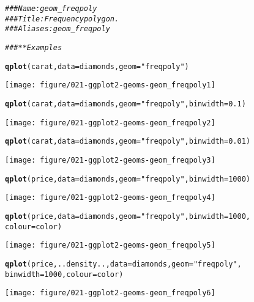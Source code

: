\documentclass[a4paper,titlepage]{tufte-handout}\usepackage[]{graphicx}\usepackage[]{color}
\makeatletter
\def\maxwidth{ %
  \ifdim\Gin@nat@width>\linewidth
    \linewidth
  \else
    \Gin@nat@width
  \fi
}
\newcommand{\hlnum}[1]{\textcolor[rgb]{0.686,0.059,0.569}{#1}}%
\newcommand{\hlstr}[1]{\textcolor[rgb]{0.192,0.494,0.8}{#1}}%
\newcommand{\hlcom}[1]{\textcolor[rgb]{0.678,0.584,0.686}{\textit{#1}}}%
\newcommand{\hlstd}[1]{\textcolor[rgb]{0.345,0.345,0.345}{#1}}%
\newcommand{\hlkwc}[1]{\textcolor[rgb]{0.333,0.667,0.333}{#1}}%
\newcommand{\hlkwd}[1]{\textcolor[rgb]{0.737,0.353,0.396}{\textbf{#1}}}%
\newenvironment{kframe}{%
 \def\at@end@of@kframe{}%
 \ifinner\ifhmode%
  \def\at@end@of@kframe{\end{minipage}}%
  \begin{minipage}{\columnwidth}%
 \fi\fi%
 \def\FrameCommand##1{\hskip\@totalleftmargin \hskip-\fboxsep
 \colorbox{shadecolor}{##1}\hskip-\fboxsep
     \hskip-\linewidth \hskip-\@totalleftmargin \hskip\columnwidth}%
 \MakeFramed {\advance\hsize-\width
   \@totalleftmargin\z@ \linewidth\hsize
   \@setminipage}}%
 {\par\unskip\endMakeFramed%
 \at@end@of@kframe}
\newenvironment{knitrout}{}{} %
\makeatother
\begin{document}
\begin{knitrout}
\color{fgcolor}\begin{kframe}
\begin{alltt}
\hlcom{### Name: geom_freqpoly}
\hlcom{### Title: Frequency polygon.}
\hlcom{### Aliases: geom_freqpoly}

\hlcom{### ** Examples}

\hlkwd{qplot}\hlstd{(carat,} \hlkwc{data} \hlstd{= diamonds,} \hlkwc{geom} \hlstd{=} \hlstr{"freqpoly"}\hlstd{)}
\end{alltt}


{\ttfamily\noindent\itshape\color{messagecolor}{\#\# stat\_bin: binwidth defaulted to range/30. Use 'binwidth = x' to adjust this.}}\end{kframe}
\texttt{[image: figure/021-ggplot2-geoms-geom\_freqpoly1]} 
\begin{kframe}\begin{alltt}
\hlkwd{qplot}\hlstd{(carat,} \hlkwc{data} \hlstd{= diamonds,} \hlkwc{geom} \hlstd{=} \hlstr{"freqpoly"}\hlstd{,} \hlkwc{binwidth} \hlstd{=} \hlnum{0.1}\hlstd{)}
\end{alltt}
\end{kframe}
\texttt{[image: figure/021-ggplot2-geoms-geom\_freqpoly2]} 
\begin{kframe}\begin{alltt}
\hlkwd{qplot}\hlstd{(carat,} \hlkwc{data} \hlstd{= diamonds,} \hlkwc{geom} \hlstd{=} \hlstr{"freqpoly"}\hlstd{,} \hlkwc{binwidth} \hlstd{=} \hlnum{0.01}\hlstd{)}
\end{alltt}
\end{kframe}
\texttt{[image: figure/021-ggplot2-geoms-geom\_freqpoly3]} 
\begin{kframe}\begin{alltt}
\hlkwd{qplot}\hlstd{(price,} \hlkwc{data} \hlstd{= diamonds,} \hlkwc{geom} \hlstd{=} \hlstr{"freqpoly"}\hlstd{,} \hlkwc{binwidth} \hlstd{=} \hlnum{1000}\hlstd{)}
\end{alltt}
\end{kframe}
\texttt{[image: figure/021-ggplot2-geoms-geom\_freqpoly4]} 
\begin{kframe}\begin{alltt}
\hlkwd{qplot}\hlstd{(price,} \hlkwc{data} \hlstd{= diamonds,} \hlkwc{geom} \hlstd{=} \hlstr{"freqpoly"}\hlstd{,} \hlkwc{binwidth} \hlstd{=} \hlnum{1000}\hlstd{,}
  \hlkwc{colour} \hlstd{= color)}
\end{alltt}
\end{kframe}
\texttt{[image: figure/021-ggplot2-geoms-geom\_freqpoly5]} 
\begin{kframe}\begin{alltt}
\hlkwd{qplot}\hlstd{(price, ..density..,} \hlkwc{data} \hlstd{= diamonds,} \hlkwc{geom} \hlstd{=} \hlstr{"freqpoly"}\hlstd{,}
  \hlkwc{binwidth} \hlstd{=} \hlnum{1000}\hlstd{,} \hlkwc{colour} \hlstd{= color)}
\end{alltt}
\end{kframe}
\texttt{[image: figure/021-ggplot2-geoms-geom\_freqpoly6]} 

\end{knitrout}
\end{document}
